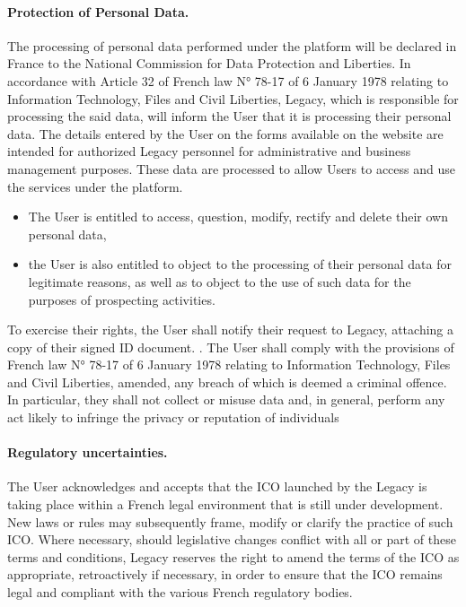 \paragraph{Protection of Personal Data.} The processing of personal data performed under the platform will be declared in France to the National Commission for Data Protection and Liberties. In accordance with Article 32 of French law N° 78-17 of 6 January 1978 relating to Information Technology, Files and Civil Liberties, Legacy, which is responsible for processing the said data, will inform the User that it is processing their personal data. The details entered by the User on the forms available on the website are intended for authorized Legacy personnel for administrative and business management purposes. These data are processed to allow Users to access and use the services under the platform.

\begin{itemize}
	\item The User is entitled to access, question, modify, rectify and delete their own personal data,
	\item the User is also entitled to object to the processing of their personal data for legitimate reasons, as well as to object to the use of such data for the purposes of prospecting activities.
\end{itemize}

To exercise their rights, the User shall notify their request to Legacy, attaching a copy of their signed ID document.
\vspace{2mm}.
The User shall comply with the provisions of French law N° 78-17 of 6 January 1978 relating to Information Technology, Files and Civil Liberties, amended, any breach of which is deemed a criminal offence. In particular, they shall not collect or misuse data and, in general, perform any act likely to infringe the privacy or reputation of individuals

\paragraph{Regulatory uncertainties.}
The User acknowledges and accepts that the ICO launched by the Legacy is taking place within a French legal environment that is still under development. New laws or rules may subsequently frame, modify or clarify the practice of such ICO. Where necessary, should legislative changes conflict with all or part of these terms and conditions, Legacy reserves the right to amend the terms of the ICO as appropriate, retroactively if necessary, in order to ensure that the ICO remains legal and compliant with the various French regulatory bodies.

